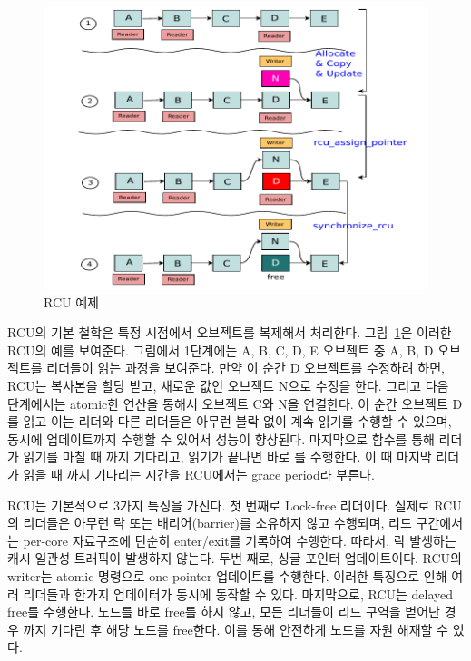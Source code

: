 \begin{figure}[h]
    \centering
    \includegraphics[width=1\textwidth]{fig/rcu/rcu_principle}
    \caption{RCU 예제}
  \label{fig:rcuprinciple}
\end{figure}

RCU의 기본 철학은 특정 시점에서 오브젝트를 복제해서 처리한다. 그림~\ref{fig:rcuprinciple}은 
이러한 RCU의 예를 보여준다.
그림에서 1단계에는 A, B, C, D, E 오브젝트 중 A, B, D 오브젝트를 리더들이 읽는 과정을 보여준다.
만약 이 순간 D 오브젝트를 수정하려 하면, RCU는 복사본을 할당 받고, 새로운 값인 오브젝트 N으로 수정을 한다.
그리고 다음 단계에서는 atomic한 연산을 통해서 오브젝트 C와 N을 연결한다. 
이 순간 오브젝트 D를 읽고 이는 리더와 다른 리더들은 아무런 블락 없이 계속 읽기를 수행할 수 있으며,
 동시에 업데이트까지 수행할 수 있어서 성능이 향상된다.
마지막으로  함수를 통해 리더가 읽기를 마칠 때 까지 기다리고, 읽기가 끝나면 
바로 를 수행한다. 
이 때 마지막 리더가 읽을 때 까지 기다리는 시간을 RCU에서는 grace period라 부른다. 

RCU는 기본적으로 3가지 특징을 가진다. 첫 번째로 Lock-free 리더이다.
실제로 RCU의 리더들은 아무런 락 또는 배리어(barrier)를 소유하지 않고 수행되며, 리드 구간에서는
 per-core 자료구조에 단순히 enter/exit를 기록하여 수행한다. 
따라서, 락 발생하는 캐시 일관성 트래픽이 발생하지 않는다.
두번 째로, 싱글 포인터 업데이트이다.
RCU의 writer는 atomic 명령으로 one pointer 업데이트를 수행한다.
이러한 특징으로 인해 여러 리더들과 한가지 업데이터가 동시에 동작할 수 있다.  
마지막으로, RCU는 delayed free를 수행한다.
노드를 바로 free를 하지 않고, 모든 리더들이 리드 구역을 벋어난 경우 까지 
기다린 후 해당 노드를 free한다.
이를 통해 안전하게 노드를 자원 해재할 수 있다. 


